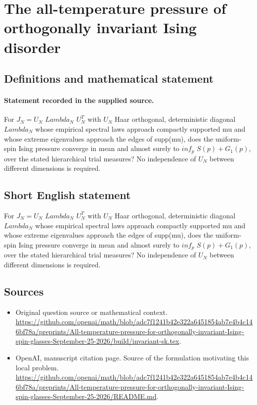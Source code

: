 \documentclass[11pt]{article}
\begin{document}
\section*{The all-temperature pressure of orthogonally invariant Ising disorder}\label{30007372}
\subsection{Definitions and mathematical statement}
\paragraph{Statement recorded in the supplied source.}
For $J_N=U_N$ $Lambda_N$ $U_N^T$ with $U_N$ Haar orthogonal, deterministic diagonal $Lambda_N$ whose empirical spectral laws approach compactly supported mu and whose extreme eigenvalues approach the edges of supp(mu), does the uniform-spin Ising pressure converge in mean and almost surely to $inf_p$ ${S(p)+G_1(p)}$, over the stated hierarchical trial measures? No independence of $U_N$ between different dimensions is required.
\subsection{Short English statement}
For $J_N=U_N$ $Lambda_N$ $U_N^T$ with $U_N$ Haar orthogonal, deterministic diagonal $Lambda_N$ whose empirical spectral laws approach compactly supported mu and whose extreme eigenvalues approach the edges of supp(mu), does the uniform-spin Ising pressure converge in mean and almost surely to $inf_p$ ${S(p)+G_1(p)}$, over the stated hierarchical trial measures? No independence of $U_N$ between different dimensions is required.
\subsection{Sources}
\begin{itemize}
\item[S1] Original question source or mathematical context.
\url{https://github.com/openai/math/blob/adc7f1241b42e322a6451854ab7e4b4c146bf78a/preprints/All-temperature-pressure-for-orthogonally-invariant-Ising-spin-glasses-September-25-2026/build/invariant-sk.tex}.
\item[S2] OpenAI, manuscript citation page. Source of the formulation motivating this local problem.
\url{https://github.com/openai/math/blob/adc7f1241b42e322a6451854ab7e4b4c146bf78a/preprints/All-temperature-pressure-for-orthogonally-invariant-Ising-spin-glasses-September-25-2026/README.md}.
\end{itemize}
\end{document}
